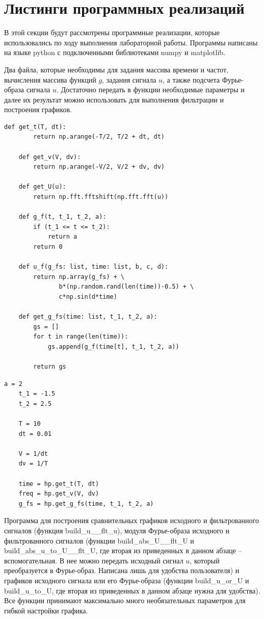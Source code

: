 \documentclass[a4paper, 12pt]{article}
\begin{document}
    \section{Листинги программных реализаций}
    В этой секции будут рассмотрены программные реализации, которые использовались по ходу выполнения лабораторной работы.
    Программы написаны на языке python с подключенными библиотеками numpy и matplotlib.


    Два файла, которые необходимы для задания массива времени и частот, вычисления массива функций $g$, задания
    сигнала $u$, а также подсчета Фурье-образа сигнала $u$. Достаточно передать в функции необходимые параметры и
    далее их результат можно использовать для выполнения фильтрации и построения графиков.


    \begin{lstlisting}[label=l1, caption={Файл help.py. Вспомогательные функции.}]
    def get_t(T, dt):
        return np.arange(-T/2, T/2 + dt, dt)   
        
    def get_v(V, dv):
        return np.arange(-V/2, V/2 + dv, dv)
          
    def get_U(u):
        return np.fft.fftshift(np.fft.fft(u))
        
    def g_f(t, t_1, t_2, a):
        if (t_1 <= t <= t_2):
            return a
        return 0
        
    def u_f(g_fs: list, time: list, b, c, d):
        return np.array(g_fs) + \
               b*(np.random.rand(len(time))-0.5) + \
               c*np.sin(d*time)
        
    def get_g_fs(time: list, t_1, t_2, a):
        gs = []
        for t in range(len(time)):
            gs.append(g_f(time[t], t_1, t_2, a))
        
        return gs   
    \end{lstlisting}
    \begin{lstlisting}[label=l2, caption={Файл static.py. Вспомогательные переменные.}]
    a = 2
    t_1 = -1.5
    t_2 = 2.5
        
    T = 10
    dt = 0.01
        
    V = 1/dt
    dv = 1/T
        
    time = hp.get_t(T, dt)
    freq = hp.get_v(V, dv)
    g_fs = hp.get_g_fs(time, t_1, t_2, a)
    \end{lstlisting}


    Программа для построения сравнительных графиков исходного и фильтрованного сигналов (функция build\_{u}\_\_{flt}\_{u}), 
    модуля Фурье-образа исходного и фильтрованного сигналов (функции build\_{abs}\_{U}\_\_{flt}\_{U} и build\_{abs}\_{u}\_{to}\_{U}\_\_{flt}\_{U}, 
    где вторая из приведенных в данном абзаце -- вспомогательная. В нее можно передать исходный сигнал $u$, который преобразуется в Фурье-образ.
    Написана лишь для удобства пользователя) и графиков исходного сигнала или его Фурье-образа (функции build\_{u}\_{or}\_{U} и build\_{u}\_{to}\_{U}, 
    где вторая из приведенных в данном абзаце нужна для удобства). Все функции принимают максимально много необязательных параметров для гибкой настройки
    графика.
\end{document}
